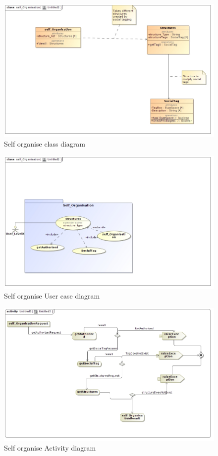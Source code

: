 \documentclass[11pt]{article}
\begin{document}
\begin{enumerate}
\begin{figure}[H]	
\graphicspath{ {../Diagrams/sfiso/} }
    	\includegraphics[scale=0.5,center]{selfC.jpg}
    	\caption{Self organise class diagram}
	\end{figure}

\begin{figure}[H]	
\graphicspath{ {../Diagrams/sfiso/} }
    	\includegraphics[scale=0.5,center]{self.jpg}
    	\caption{Self organise User case diagram}
	\end{figure}

\begin{figure}[H]	
\graphicspath{ {../Diagrams/sfiso/} }
    	\includegraphics[scale=0.5,center]{selfA.jpg}
    	\caption{Self organise Activity diagram}
	\end{figure}


\end{enumerate}
\end{document}
